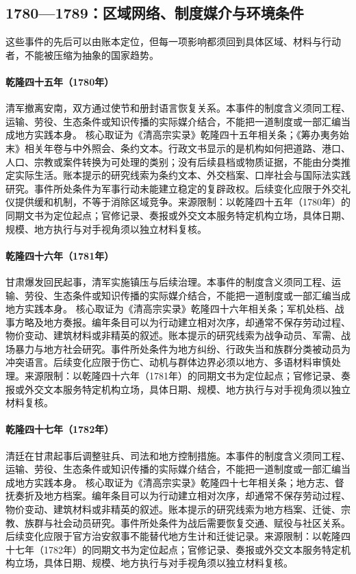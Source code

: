 \subsection{1780—1789：区域网络、制度媒介与环境条件}
这些事件的先后可以由账本定位，但每一项影响都须回到具体区域、材料与行动者，不能被压缩为抽象的国家趋势。
\hypertarget{civic:EQ-1780-VIETNAM-WITHDRAWAL}{}\paragraph{乾隆四十五年（1780年）}清军撤离安南，双方通过使节和册封语言恢复关系。本事件的制度含义须同工程、运输、劳役、生态条件或知识传播的实际媒介结合，不能把一道制度或一部汇编当成地方实践本身。 核心取证为《清高宗实录》乾隆四十五年相关条；《筹办夷务始末》相关年卷与中外照会、条约文本。行政文书显示的是机构如何把道路、港口、人口、宗教或案件转换为可处理的类别；没有后续县档或物质证据，不能由分类推定实际生活。账本提示的研究线索为条约文本、外交档案、口岸社会与国际法实践研究。事件所处条件为军事行动未能建立稳定的复辟政权。后续变化应限于外交礼仪提供缓和机制，不等于消除区域竞争。来源限制：以乾隆四十五年（1780年）的同期文书为定位起点；官修记录、奏报或外交文本服务特定机构立场，具体日期、规模、地方执行与对手视角须以独立材料复核。
\hypertarget{civic:EQ-1781-GANSU-MUSLIM-UPRISING}{}\paragraph{乾隆四十六年（1781年）}甘肃爆发回民起事，清军实施镇压与后续治理。本事件的制度含义须同工程、运输、劳役、生态条件或知识传播的实际媒介结合，不能把一道制度或一部汇编当成地方实践本身。 核心取证为《清高宗实录》乾隆四十六年相关条；军机处档、战事方略及地方奏报。编年条目可以为行动建立相对次序，却通常不保存劳动过程、物价变动、建筑材料或非精英的叙述。账本提示的研究线索为战争动员、军需、战场暴力与地方社会研究。事件所处条件为地方纠纷、行政失当和族群分类被动员为冲突语言。后续变化应限于伤亡、动机与群体边界必须以地方、多语材料审慎处理。来源限制：以乾隆四十六年（1781年）的同期文书为定位起点；官修记录、奏报或外交文本服务特定机构立场，具体日期、规模、地方执行与对手视角须以独立材料复核。
\hypertarget{civic:EQ-1782-GANSU-POSTWAR-GOVERNANCE}{}\paragraph{乾隆四十七年（1782年）}清廷在甘肃起事后调整驻兵、司法和地方控制措施。本事件的制度含义须同工程、运输、劳役、生态条件或知识传播的实际媒介结合，不能把一道制度或一部汇编当成地方实践本身。 核心取证为《清高宗实录》乾隆四十七年相关条；地方志、督抚奏折及地方档案。编年条目可以为行动建立相对次序，却通常不保存劳动过程、物价变动、建筑材料或非精英的叙述。账本提示的研究线索为地方档案、迁徙、宗教、族群与社会动员研究。事件所处条件为战后需要恢复交通、赋役与社区关系。后续变化应限于官方治安叙事不能替代地方生计和迁徙记录。来源限制：以乾隆四十七年（1782年）的同期文书为定位起点；官修记录、奏报或外交文本服务特定机构立场，具体日期、规模、地方执行与对手视角须以独立材料复核。
